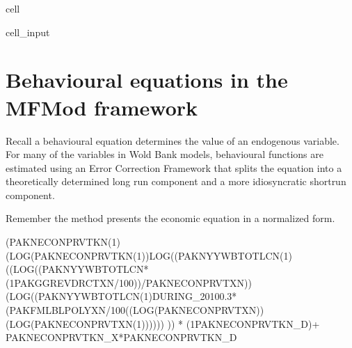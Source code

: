 \documentclass[letterpaper,10pt,english]{jupyterBook}
\begin{document}
\begin{sphinxuseclass}{cell}\begin{sphinxVerbatimInput}

\begin{sphinxuseclass}{cell_input}
\begin{sphinxVerbatim}[commandchars=\\\{\}]
\end{sphinxVerbatim}

\end{sphinxuseclass}\end{sphinxVerbatimInput}

\end{sphinxuseclass}

\section{Behavioural equations in the MFMod framework}
\label{\detokenize{content/06_WBModels/LoadingWBModel:behavioural-equations-in-the-mfmod-framework}}
\sphinxAtStartPar
Recall a behavioural equation determines the value of an endogenous variable. For many of the variables in Wold Bank models, behavioural functions are estimated using an Error Correction Framework that splits the equation into a theoretically determined long run component and a more idiosyncratic short\sphinxhyphen{}run component.

\sphinxAtStartPar
Remember the  method presents the economic equation in a normalized form.

\sphinxAtStartPar
(PAKNECONPRVTKN(\sphinxhyphen{}1)(LOG(PAKNECONPRVTKN(\sphinxhyphen{}1))\sphinxhyphen{}LOG((PAKNYYWBTOTLCN(\sphinxhyphen{}1)((LOG((PAKNYYWBTOTLCN*(1\sphinxhyphen{}PAKGGREVDRCTXN/100))/PAKNECONPRVTXN))\sphinxhyphen{}(LOG((PAKNYYWBTOTLCN(\sphinxhyphen{}1)DURING\_2010\sphinxhyphen{}0.3*(PAKFMLBLPOLYXN/100\sphinxhyphen{}((LOG(PAKNECONPRVTXN))\sphinxhyphen{}(LOG(PAKNECONPRVTXN(\sphinxhyphen{}1)))))) )) * (1\sphinxhyphen{}PAKNECONPRVTKN\_D)+ PAKNECONPRVTKN\_X*PAKNECONPRVTKN\_D
\end{document}
